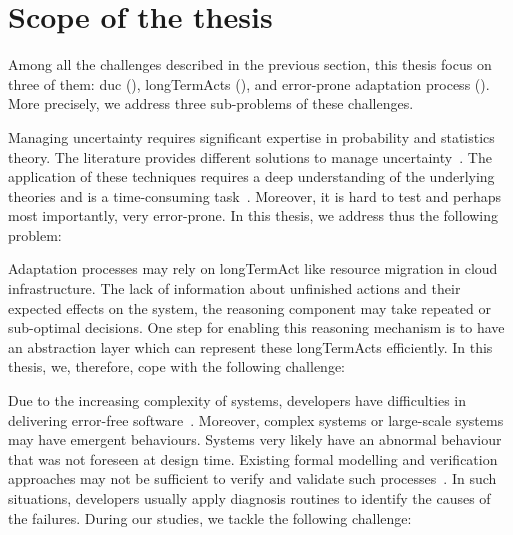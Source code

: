 \section{Scope of the thesis}

Among all the challenges described in the previous section, this thesis focus on three of them: \gls{duc} (), \glspl{longTermAct} (), and error-prone adaptation process ().
More precisely, we address three sub-problems of these challenges.

Managing uncertainty requires significant expertise in probability and statistics theory.
The literature provides different solutions to manage uncertainty~\cite{zadeh1996fuzzy,metrology2008evaluation,shafer1992dempster}.
The application of these techniques requires a deep understanding of the underlying theories and is a time-consuming task~\cite{DBLP:conf/quatic/VallecilloMO16}.
Moreover, it is hard to test and perhaps most importantly, very error-prone.
In this thesis, we address thus the following problem:
\vspace{-2em}

Adaptation processes may rely on \gls{longTermAct} like resource migration in cloud infrastructure.
The lack of information about unfinished actions and their expected effects on the system, the reasoning component may take repeated or sub-optimal decisions.
One step for enabling this reasoning mechanism is to have an abstraction layer which can represent these \glspl{longTermAct} efficiently.
In this thesis, we, therefore, cope with the following challenge:
\vspace{-2em}

Due to the increasing complexity of systems, developers have difficulties in delivering error-free software~\cite{DBLP:conf/icse/BarbosaLMJ17, DBLP:conf/icse/MongielloPS15, DBLP:conf/icse/HassanBB15}.
Moreover, complex systems or large-scale systems may have emergent behaviours.
Systems very likely have an abnormal behaviour that was not foreseen at design time.
Existing formal modelling and verification approaches may not be sufficient to verify and validate such processes~\cite{DBLP:conf/icse/TaharaOH17}.
In such situations, developers usually apply diagnosis routines to identify the causes of the failures.
During our studies, we tackle the following challenge:
\vspace{-2em}

